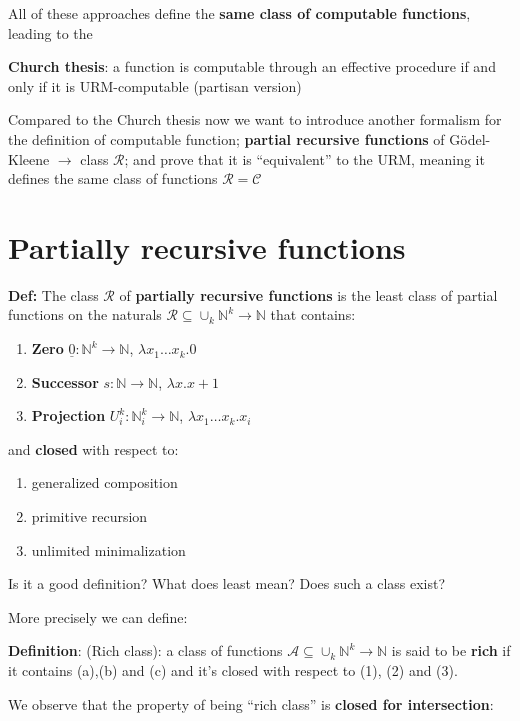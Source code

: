 \documentclass{amsbook}
\newcommand{\nat}{\ensuremath{\mathbb{N}}}
\theoremstyle{definition}
\theoremstyle{remark}
\numberwithin{section}{chapter}
\numberwithin{equation}{chapter}
\begin{document}
All of these approaches define the \textbf{same class of computable functions}, leading to the

\textbf{Church thesis}: a function is computable through an effective procedure if and only if it is URM-computable (partisan version)

Compared to the Church thesis now we want to introduce another formalism for the definition of computable function; \textbf{partial recursive functions} of Gödel-Kleene $\rightarrow$ class $\mathcal{R}$; and prove that it is ``equivalent'' to the URM, meaning it defines the same class of functions $\mathcal{R} = \mathcal{C}$

\section{Partially recursive functions}

\textbf{Def:} The class $ \mathcal{R} $ of \textbf{partially recursive functions} is the least class of partial functions on the naturals $\mathcal{R}\subseteq \cup_k \nat^k\rightarrow\nat$ that contains:

\begin{enumerate}[label=(\alph*)]
	\item \textbf{Zero} $ \underline{0}: \nat^k \rightarrow \nat $, $\lambda x_1\dots x_k . 0$
	\item \textbf{Successor} $ s: \nat \rightarrow \nat $, $\lambda x . x+1$
	\item \textbf{Projection} $ U_i^k: \nat_i^k \rightarrow \nat $,  $\lambda x_1\dots x_k . x_i$
\end{enumerate}

and \textbf{closed} with respect to:
\begin{enumerate}
	\item generalized composition
	\item primitive recursion
	\item unlimited minimalization
\end{enumerate}

Is it a good definition? What does least mean? Does such a class exist?

More precisely we can define:

\textbf{Definition}: (Rich class): a class of functions $\mathcal{A} \subseteq \cup_k \nat^k\rightarrow\nat$ is said to be \textbf{rich} if it contains (a),(b) and (c) and it's closed with respect to (1), (2) and (3).

We observe that the property of being ``rich class'' is \textbf{closed for intersection}:
\end{document}
